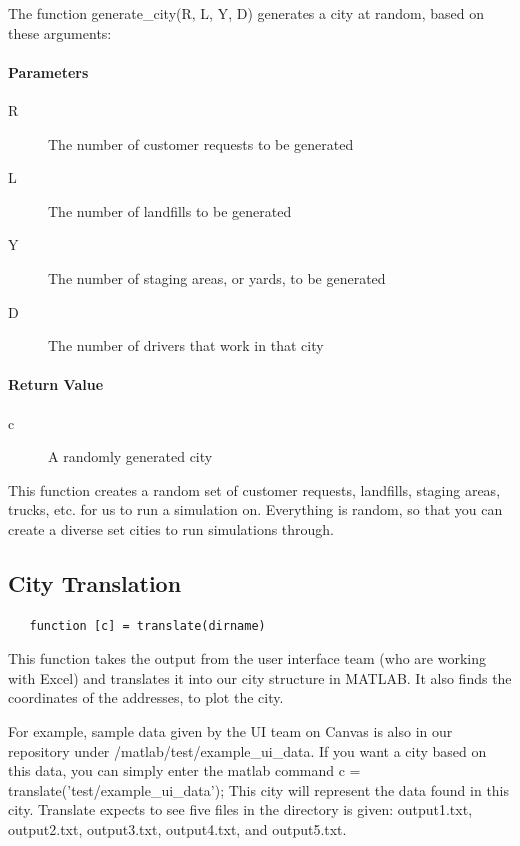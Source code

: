 \documentclass{article}
\begin{document}
The function generate\_city(R, L, Y, D) generates a city at random, based on these arguments:

\paragraph{Parameters}
\begin{description}
\item[R] The number of customer requests to be generated
\item[L] The number of landfills to be generated
\item[Y] The number of staging areas, or yards, to be generated
\item[D] The number of drivers that work in that city
\end{description}

\paragraph{Return Value}
\begin{description}
\item[c] A randomly generated city
\end{description}

This function creates a random set of customer requests, landfills, staging areas, trucks, etc. for us to run a simulation on. 
Everything is random, so that you can create a diverse set cities to run simulations through. 


\subsection{City Translation}

\begin{verbatim}
   function [c] = translate(dirname)
\end{verbatim}

This function takes the output from the user interface team (who are working with Excel) and translates it into our city structure in MATLAB. 
It also finds the coordinates of the addresses, to plot the city. 

For example, sample data given by the UI team on Canvas is also in our repository under /matlab/test/example\_ui\_data.
If you want a city based on this data, you can simply enter the matlab command c = translate('test/example\_ui\_data'); This city will represent the data found in this city.
Translate expects to see five files in the directory is given: output1.txt, output2.txt, output3.txt, output4.txt, and output5.txt.
\end{document}
